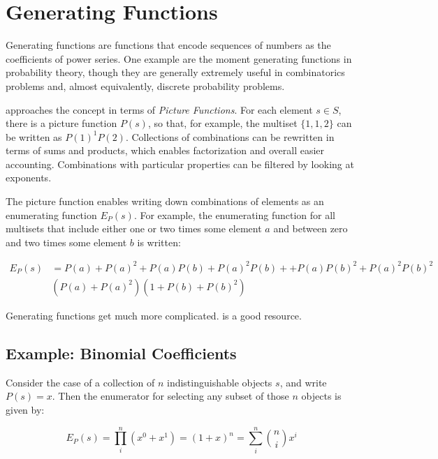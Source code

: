 \section{Generating Functions}

Generating functions are functions that encode sequences of numbers as the coefficients of power series. One example are the moment generating functions in probability theory, though they are generally extremely useful in combinatorics problems and, almost equivalently, discrete probability problems. 

 approaches the concept in terms of \textit{Picture Functions}. For each element $s\in S$, there is a picture function $P(s)$, so that, for example, the multiset $\{1,1,2\}$ can be written as $P(1)^1 P(2)$. Collections of combinations can be rewritten in terms of sums and products, which enables factorization and overall easier accounting. Combinations with particular properties can be filtered by looking at exponents. 

The picture function enables writing down combinations of elements as an enumerating function $E_P(s)$. For example, the enumerating function for all multisets that include either one or two times some element $a$ and between zero and two times some element $b$ is written:

\begin{equation}
\begin{array}{rl}
E_P(s) &= P(a)+ P(a)^2 + P(a)P(b) + P(a)^2P(b) +  + P(a)P(b)^2 + P(a)^2P(b)^2\\
&\left(P(a) + P(a)^2\right)\left(1 + P(b) + P(b)^2\right)
\end{array}
\end{equation}

Generating functions get much more complicated.  is a good resource.


\subsection{Example: Binomial Coefficients}

Consider the case of a collection of $n$ indistinguishable objects $s$, and write $P(s) = x$. Then the enumerator for selecting any subset of those $n$ objects is given by: 

\begin{equation}
E_P(s) = \prod_i^n (x^0+x^1) = (1+x)^n = \sum_i^n {n \choose i}x^i
\end{equation}

